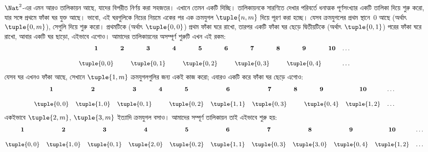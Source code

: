 \documentclass[../../../include/open-logic-section]{subfiles}
\begin{document}


\begin{explain}
$\Nat^2$-এর এমন আরও তালিকায়ন আছে, যাদের বিপরীত নির্ণয় করা সহজতর। এখানে তেমন একটি দিচ্ছি। তালিকায়নকে সারণিতে দেখার পরিবর্তে ধনাত্মক পূর্ণসংখ্যার একটি তালিকা দিয়ে শুরু করো, যার সঙ্গে প্রথমে ফাঁকা ঘর যুক্ত আছে। ভাবো, এই ঘরগুলিকে নিচের নিয়মে একের পর এক ক্রমযুগল $\tuple{n,m}$ দিয়ে পূরণ করা হচ্ছে। যেসব ক্রমযুগলের প্রথম স্থানে~$0$ আছে (অর্থাৎ $\tuple{0,m}$), সেগুলি দিয়ে শুরু করো। প্রথমটিকে (অর্থাৎ $\tuple{0,0}$) প্রথম ফাঁকা ঘরে রাখো, তারপর একটি ফাঁকা ঘর ছেড়ে দ্বিতীয়টিকে (অর্থাৎ $\tuple{0,1}$) পরের ফাঁকা ঘরে রাখো, আবার একটি ঘর ছাড়ো, এইভাবে এগোও। আমাদের তালিকায়নের অসম্পূর্ণ শুরুটি এখন এই রকম:
\[\small
\begin{array}{@{}c c c c c c c c c c c@{}}
\mathbf 1 & \mathbf 2 & \mathbf 3 & \mathbf 4 & \mathbf 5 & \mathbf 6 & \mathbf 7 & \mathbf 8 & \mathbf 9 & \mathbf{10} & \dots \\ \\
\tuple{0,0} &  & \tuple{0,1} &  & \tuple{0,2} &  & \tuple{0,3} & & \tuple{0,4} &  & \dots \\
\end{array}
\]
যেসব ঘর এখনও ফাঁকা আছে, সেখানে $\tuple{1,m}$ ক্রমযুগলগুলির জন্য একই কাজ করো; এবারও একটি করে ফাঁকা ঘর ছেড়ে এগোও:
\[\small
\begin{array}{@{}c c c c c c c c c c c@{}}
\mathbf 1 & \mathbf 2 & \mathbf 3 & \mathbf 4 & \mathbf 5 & \mathbf 6 & \mathbf 7 & \mathbf 8 & \mathbf 9 & \mathbf{10} & \dots \\ \\
\tuple{0,0} & \tuple{1,0} & \tuple{0,1} &  & \tuple{0,2} & \tuple{1,1} &
\tuple{0,3} & & \tuple{0,4} &  \tuple{1,2} & \dots \\
\end{array}
\]
একইভাবে $\tuple{2,m}$, $\tuple{3,m}$ ইত্যাদি ক্রমযুগল বসাও। আমাদের সম্পূর্ণ তালিকায়ন তাই এইভাবে শুরু হয়: 
\[\small
\begin{array}{@{}cc c c c c c c c c c@{}}
\mathbf 1 & \mathbf 2 & \mathbf 3 & \mathbf 4 & \mathbf 5 & \mathbf 6 & \mathbf 7 & \mathbf 8 & \mathbf 9 & \mathbf{10} & \dots \\ \\
\tuple{0,0} & \tuple{1,0} & \tuple{0,1} & \tuple{2,0}  & \tuple{0,2} &
\tuple{1,1} & \tuple{0,3} & \tuple{3,0}  & \tuple{0,4} &  \tuple{1,2} & \dots \\
\end{array}
\]
\end{explain}
\end{document}

